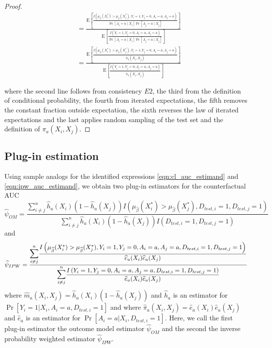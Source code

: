 \begin{proof}
$$\begin{aligned}
& = \frac{\mathrm{E}\left[\frac{I\left(\mu_{\widehat{\beta}}(X_i^*)>\mu_{\widehat{\beta}}(X_j^*), Y_i=1, Y_j=0, A_i = a, A_j = a\right)}{\operatorname{Pr}\left[A_i = a \mid X_i\right] \operatorname{Pr}\left[A_j = a \mid X_j\right]} \right]}{\mathrm{E}\left[\frac{I\left(Y_i=1, Y_j=0, A_i = a, A_j = a\right)}{\operatorname{Pr}[A_i = a \mid X_i] \Pr[A_j = a \mid X_j]}\right]} \\
& = \frac{\mathrm{E}\left[\frac{I\left(\mu_{\widehat{\beta}}(X_i^*)>\mu_{\widehat{\beta}}(X_j^*), Y_i=1, Y_j=0, A_i = a, A_j = a\right)}{\pi_a(X_i, X_j)} \right]}{\mathrm{E}\left[\frac{I\left(Y_i=1, Y_j=0, A_i = a, A_j = a\right)}{\pi_a(X_i, X_j)}\right]} 
\end{aligned}
$$

   
where the second line follows from consistency $E2$, the third from the definition of conditional probability, the fourth from iterated expectations, the fifth removes the constant fraction outside expectation, the sixth reverses the law of iterated expectations and the last applies random sampling of the test set and the definition of $\pi_a(X_i, X_j)$.
\end{proof}

\subsection{Plug-in estimation}
Using sample analogs for the identified expressions \ref{eqn:cl_auc_estimand} and \ref{eqn:ipw_auc_estimand}, we obtain two plug-in estimators for the counterfactual AUC
    \begin{equation*}
        \widehat{\psi}_{OM} = \frac{\sum_{i \neq j}^n\widehat{h}_a(X_i) (1 - \widehat{h}_a(X_j)) I(\mu_{\widehat{\beta}}(X_i^*)>\mu_{\widehat{\beta}}(X_j^*), D_{test, i} = 1,  D_{test, j} = 1) }{\sum_{i \neq j}^n\widehat{h}_a(X_i) (1 - \widehat{h}_a(X_j)) I(D_{test, i} = 1,  D_{test, j} = 1)}
    \end{equation*}
    and 
    \begin{equation*}
        \widehat{\psi}_{IPW} = \frac{\mathlarger{\mathlarger{\sum}}_{i \neq j}^n \dfrac{I\left(\mu_{\widehat{\beta}}(X_i^*)>\mu_{\widehat{\beta}}(X_j^*), Y_i = 1, Y_j = 0, A_i = a, A_j = a, D_{test, i} = 1,  D_{test, j} = 1\right)}{\widehat{e}_a(X_i) \widehat{e}_a(X_j)}}{\mathlarger{\mathlarger{\sum}}_{i \neq j}^n\dfrac{I\left(Y_i = 1, Y_j = 0, A_i = a, A_j = a, D_{test, i} = 1,  D_{test, j} = 1\right)}{\widehat{e}_a(X_i) \widehat{e}_a(X_j)}}
    \end{equation*}
    where $\widehat{m}_a(X_i, X_j) = \widehat{h}_a(X_i) (1 - \widehat{h}_a(X_j))$ and $\widehat{h}_a$ is an estimator for $\operatorname{Pr}[Y_i=1 | X_i,A_i = a, D_{test,i} = 1]$ and where $\widehat{\pi}_a(X_i, X_j) = \widehat{e}_a(X_i) \widehat{e}_a(X_j)$ and $\widehat{e}_a$ is an estimator for $\Pr[A_i = a | X_i, D_{test,i} = 1]$. Here, we call the first plug-in estimator the outcome model estimator $ \widehat{\psi}_{OM}$ and the second the inverse probability weighted estimator $\widehat{\psi}_{IPW}$. 


